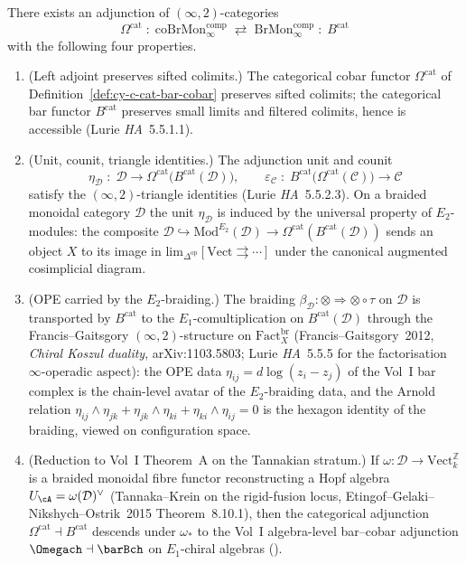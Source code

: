 \begin{theorem}
\label{thm:cy-c-cat-thm-A}
There exists an adjunction of $(\infty,2)$-categories
\[
 \Omega^{\mathrm{cat}}
 \;:\; \mathrm{coBrMon}^{\mathrm{comp}}_\infty
 \;\rightleftarrows\;
 \mathrm{BrMon}^{\mathrm{comp}}_\infty
 \;:\; B^{\mathrm{cat}}
\]
with the following four properties.
\begin{enumerate}[label=\textup{(A\arabic*)}]
 \item \textup{(Left adjoint preserves sifted colimits.)}
 The categorical cobar functor $\Omega^{\mathrm{cat}}$ of
 Definition~\ref{def:cy-c-cat-bar-cobar} preserves sifted
 colimits; the categorical bar functor $B^{\mathrm{cat}}$
 preserves small limits and filtered colimits, hence is
 accessible (Lurie \emph{HA}~5.5.1.1).
 \item \textup{(Unit, counit, triangle identities.)}
 The adjunction unit and counit
 \[
 \eta_{\mathcal D}
 \;:\;
 \mathcal D \longrightarrow
 \Omega^{\mathrm{cat}}\!\bigl(B^{\mathrm{cat}}(\mathcal D)\bigr),
 \qquad
 \varepsilon_{\mathcal C}
 \;:\;
 B^{\mathrm{cat}}\!\bigl(\Omega^{\mathrm{cat}}(\mathcal C)\bigr)
 \longrightarrow \mathcal C
 \]
 satisfy the $(\infty,2)$-triangle identities (Lurie
 \emph{HA}~5.5.2.3). On a braided monoidal category
 $\mathcal D$ the unit $\eta_{\mathcal D}$ is induced by the
 universal property of $E_2$-modules: the composite
 $\mathcal D \hookrightarrow \mathrm{Mod}^{E_2}(\mathcal D) \to
 \Omega^{\mathrm{cat}}(B^{\mathrm{cat}}(\mathcal D))$ sends an
 object $X$ to its image in
 $\mathrm{lim}_{\Delta^{\mathrm{op}}}[\mathrm{Vect} \rightrightarrows
 \cdots]$ under the canonical augmented cosimplicial diagram.
 \item \textup{(OPE carried by the $E_2$-braiding.)}
 The braiding
 $\beta_{\mathcal D} : \otimes \Rightarrow \otimes \circ \tau$
 on $\mathcal D$ is transported by $B^{\mathrm{cat}}$ to the
 $E_1$-comultiplication on $B^{\mathrm{cat}}(\mathcal D)$
 through the Francis--Gaitsgory $(\infty,2)$-structure on
 $\mathrm{Fact}_X^{\mathrm{br}}$
 (Francis--Gaitsgory~2012, \emph{Chiral Koszul duality},
 arXiv:1103.5803; Lurie \emph{HA}~5.5.5 for the factorisation
 $\infty$-operadic aspect): the OPE data
 $\eta_{ij} = d\log(z_i - z_j)$ of the Vol~I bar complex is the
 chain-level avatar of the $E_2$-braiding data, and the
 Arnold relation
 $\eta_{ij} \wedge \eta_{jk} + \eta_{jk} \wedge \eta_{ki}
 + \eta_{ki} \wedge \eta_{ij} = 0$ is the hexagon identity of
 the braiding, viewed on configuration space.
 \item \textup{(Reduction to Vol~I Theorem~A on the Tannakian stratum.)}
 If $\omega : \mathcal D \to \mathrm{Vect}_k^{\mathbb Z}$ is a
 braided monoidal fibre functor reconstructing a Hopf algebra
 $U_{\cA} = \omega(\mathcal D)^\vee$ (Tannaka--Krein on the
 rigid-fusion locus, Etingof--Gelaki--Nikshych--Ostrik~2015
 Theorem~8.10.1), then the categorical adjunction
 $\Omega^{\mathrm{cat}} \dashv B^{\mathrm{cat}}$ descends under
 $\omega_*$ to the Vol~I algebra-level bar--cobar adjunction
 $\Omegach \dashv \barBch$ on $E_1$-chiral algebras
 (\cite{VolI}).
\end{enumerate}
\end{theorem}

